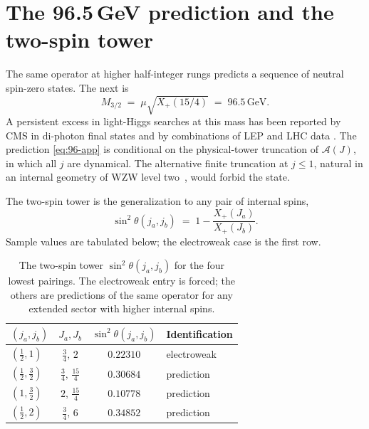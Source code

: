 \documentclass[aps,prd,onecolumn,superscriptaddress,nofootinbib,reprint]{revtex4-2}
\newcommand{\Xp}{X_{+}}
\newcommand{\half}{\tfrac12}
\newcommand{\cA}{\mathcal{A}}
\begin{document}
\section{The 96.5\,GeV prediction and the two-spin tower}
\label{app:tower}

The same operator at higher half-integer rungs predicts a sequence of
neutral spin-zero states.  The next is
\begin{equation}
  M_{3/2}\;=\;\mu\sqrt{\Xp(15/4)}\;=\;96.5\,\text{GeV}.
\label{eq:96-app}
\end{equation}
A persistent excess in light-Higgs searches at this mass has been
reported by CMS in di-photon final states \cite{CMS96} and by
combinations of LEP and LHC data \cite{Heinemeyer2019}.  The prediction
\eqref{eq:96-app} is conditional on the physical-tower truncation of
$\cA(J)$, in which all $j$ are dynamical.  The alternative finite
truncation at $j\le 1$, natural in an internal geometry of WZW level
two~\cite{Bouwknegt1995}, would forbid the state.

The two-spin tower is the generalization to any pair of internal spins,
\begin{equation}
  \sin^{2}\theta(j_{a},j_{b})\;=\;1-\frac{\Xp(J_{a})}{\Xp(J_{b})}.
\label{eq:tower-app}
\end{equation}
Sample values are tabulated below; the electroweak case is the first
row.

\begin{table}[h]
\centering
\begin{tabular}{lccl}
\toprule
$(j_{a},j_{b})$ & $J_{a},J_{b}$ & $\sin^{2}\theta(j_{a},j_{b})$ & Identification\\
\midrule
$(\half,1)$ & $\tfrac34,\,2$ & $0.22310$ & electroweak\\
$(\half,\tfrac32)$ & $\tfrac34,\,\tfrac{15}4$ & $0.30684$ & prediction\\
$(1,\tfrac32)$ & $2,\,\tfrac{15}4$ & $0.10778$ & prediction\\
$(\half,2)$ & $\tfrac34,\,6$ & $0.34852$ & prediction\\
\bottomrule
\end{tabular}
\caption{The two-spin tower $\sin^{2}\theta(j_{a},j_{b})$ for the four
lowest pairings.  The electroweak entry is forced; the others are
predictions of the same operator for any extended sector with higher
internal spins.}
\label{tab:tower-app}
\end{table}
\end{document}
